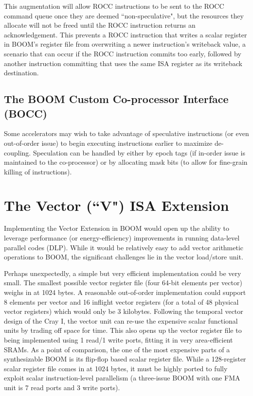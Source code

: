 This augmentation will allow ROCC instructions to be sent to the ROCC command queue once they are deemed ``non-speculative", but the resources they allocate will not be freed until the ROCC instruction returns an acknowledgement.  This prevents a ROCC instruction that writes a scalar register in BOOM's register file from overwriting a newer instruction's writeback value, a scenario that can occur if the ROCC instruction commits too early, followed by another instruction committing that uses the same ISA register as its writeback destination. 


\subsection{The BOOM Custom Co-processor Interface (BOCC)}

Some accelerators may wish to take advantage of speculative instructions (or even out-of-order issue) to begin executing instructions earlier to maximize de-coupling.  Speculation can be handled by either by epoch tags (if in-order issue is maintained to the co-processor) or by allocating mask bits (to allow for fine-grain killing of instructions). 

\section{The Vector (``V") ISA Extension}

Implementing the Vector Extension in BOOM would open up the ability to leverage performance (or energy-efficiency) improvements in running data-level parallel codes (DLP).  While it would be relatively easy to add vector arithmetic operations to BOOM, the significant challenges lie in the vector load/store unit. 

Perhaps unexpectedly, a simple but very efficient implementation could be very small.  The smallest possible vector register file (four 64-bit elements per vector) weighs in at 1024 bytes.  A reasonable out-of-order implementation could support 8 elements per vector and 16 inflight vector registers (for a total of 48 physical vector registers) which would only be 3 kilobytes.  Following the temporal vector design of the Cray I, the vector unit can re-use the expensive scalar functional units by trading off space for time.  This also opens up the vector register file to being implemented using 1 read/1 write ports, fitting it in very area-efficient SRAMs.  As a point of comparison, the one of the most expensive parts of a synthesizable BOOM is its flip-flop based scalar register file.  While a 128-register scalar register file comes in at 1024 bytes, it must be highly ported to fully exploit scalar instruction-level parallelism (a three-issue BOOM with one FMA unit is 7 read ports and 3 write ports).


